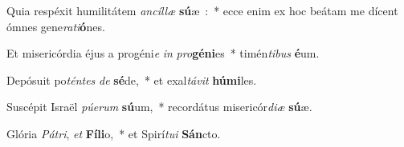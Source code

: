 ﻿\item Quia respéxit humilitátem \emph{an}\-\emph{cíl}\-\emph{læ} \textbf{sú}\-æ~:~* ecce enim ex hoc beátam me dícent ómnes gene\emph{ra}\emph{ti}\textbf{ó}nes.
\item Et misericórdia éjus a progéni\emph{e} \emph{in} \emph{pro}\-\textbf{gé}\-\textbf{ni}\-es~* timén\emph{ti}\-\emph{bus} \textbf{é}um.
\item Depósuit po\emph{tén}\-\emph{tes} \emph{de} \textbf{sé}\-de,~* et exal\emph{tá}\-\emph{vit} \textbf{hú}\textbf{mi}les.
\item Suscépit Israël \emph{pú}\-\emph{e}\-\emph{rum} \textbf{sú}\-um,~* recordátus misericór\emph{di}\-\emph{æ} \textbf{sú}æ.
\item Glória \emph{Pá}\-\emph{tri}, \emph{et} \textbf{Fí}\-\textbf{li}\-o,~* et Spirí\emph{tu}\-\emph{i} \textbf{Sán}cto.
